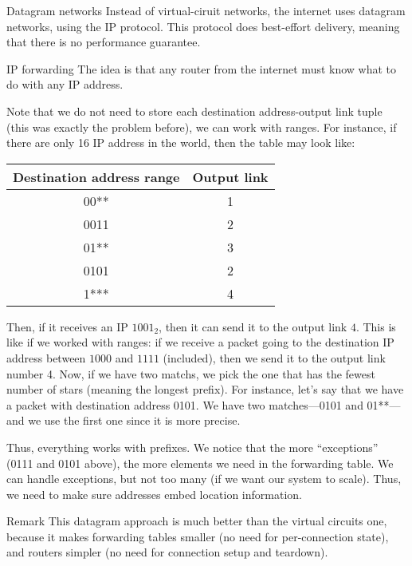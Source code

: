 \documentclass[a4paper]{article}
\begin{document}
\begin{parag}{Datagram networks}
    Instead of virtual-ciruit networks, the internet uses datagram networks, using the IP protocol. This protocol does best-effort delivery, meaning that there is no performance guarantee. 
\end{parag}

\begin{parag}{IP forwarding}
    The idea is that any router from the internet must know what to do with any IP address.

    Note that we do not need to store each destination address-output link tuple (this was exactly the problem before), we can work with ranges. For instance, if there are only 16 IP address in the world, then the table may look like:
    \begin{center}
    \begin{tabular}{|c|c|}
        \hline
        Destination address range & Output link \\
        \hline
        00** & 1 \\
        0011 & 2 \\
        01** & 3 \\
        0101 & 2 \\
        1*** & 4  \\
        \hline
    \end{tabular}
    \end{center}

    Then, if it receives an IP $1001_{2}$, then it can send it to the output link $4$. This is like if we worked with ranges: if we receive a packet going to the destination IP address between $1000$ and $1111$ (included), then we send it to the output link number 4. Now, if we have two matchs, we pick the one that has the fewest number of stars (meaning the longest prefix). For instance, let's say that we have a packet with destination address 0101. We have two matches---0101 and 01**---and we use the first one since it is more precise.

    Thus, everything works with prefixes. We notice that the more ``exceptions'' (0111 and 0101 above), the more elements we need in the forwarding table. We can handle exceptions, but not too many (if we want our system to scale). Thus, we need to make sure addresses embed location information.

    \begin{subparag}{Remark}
        This datagram approach is much better than the virtual circuits one, because it makes forwarding tables smaller (no need for per-connection state), and routers simpler (no need for connection setup and teardown).
    \end{subparag}
\end{parag}
\end{document}

